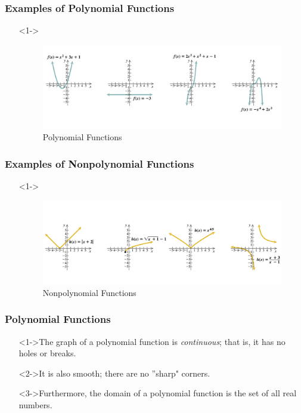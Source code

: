 \documentclass{beamer}
\begin{document}
\begin{frame}
	\frametitle{Examples of Polynomial Functions}
	\begin{enumerate}
		\item[]<1->
		\begin{figure}
			\begin{center}
				\caption{Polynomial Functions}
				\includegraphics[scale=0.35]{4_1_1.png}
			\end{center}
		\end{figure}
	\end{enumerate}
\end{frame}

\begin{frame}
	\frametitle{Examples of Nonpolynomial Functions}
	\begin{enumerate}
		\item[]<1->
		\begin{figure}
			\begin{center}
				\caption{Nonpolynomial Functions}
				\includegraphics[scale=0.35]{4_1_2.png}
			\end{center}
		\end{figure}
	\end{enumerate}
\end{frame}

\begin{frame}
  \frametitle{Polynomial Functions}
  \begin{enumerate}
    \item[]<1->The graph of a polynomial function is \emph{continuous};  that is, it has no holes or breaks.
    \item[]<2->It is also smooth;  there are no ''sharp" corners.
    \item[]<3->Furthermore, the domain of a polynomial function is the set of all real numbers.
  \end{enumerate}
\end{frame}
\end{document}
